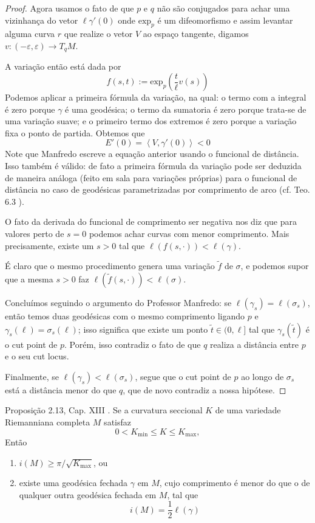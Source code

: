 \documentclass{book}
\begin{document}
\begin{proof}
Agora usamos o fato de que $p$ e $q$ não são
conjugados para
achar uma vizinhança do vetor $\ell
\gamma'(0)$ onde $\text{exp}_p$ é um
difeomorfismo e assim levantar alguma
curva $r$ que realize o vetor $V$ ao espaço
tangente,
 digamos $v:(-\varepsilon,\varepsilon) \to
 T_q M$.

A variação então está dada por
$$
f(s,t):=\text{exp}_p\left(\frac{t}{\ell}v(s)
\right)
$$
Podemos aplicar a primeira fórmula da
variação, na qual: o termo com a
integral é zero porque $\gamma$ é uma
geodésica; o termo da sumatoria é zero
porque trata-se de uma variação suave; e o
primeiro termo dos extremos é zero
porque a variação fixa o ponto de partida.
Obtemos que
$$
E'(0)=\left\langle{}V,\gamma'(0)\right\rangle{}<0
$$
Note que Manfredo escreve a equação anterior
usando o funcional de distância.
Isso também é válido: de fato a primeira
fórmula da variação pode ser
deduzida de maneira análoga (feito em sala
para variações próprias)
 para o funcional de distância no caso de
 geodésicas parametrizadas por
comprimento de arco (cf. Teo. 6.3
\cite{ler}).

O fato da derivada do funcional de
comprimento ser negativa nos diz que para
valores perto de $s=0$ podemos achar curvas
com menor comprimento. Mais
precisamente, existe um $s>0$ tal que
$\ell(f(s,\cdot))<\ell(\gamma)$.

É claro que o mesmo procedimento genera uma
variação $\tilde{f}$ de $\sigma$, e
podemos supor que a mesma $s>0$ faz
$\ell(\tilde{f}(s,\cdot))<\ell(\sigma)$.

Concluímos seguindo o argumento do Professor
Manfredo: se
$\ell(\gamma_s)=\ell(\sigma_s)$, então temos
duas geodésicas com o mesmo
comprimento ligando $p$ e
$\gamma_s(\ell)=\sigma_s(\ell)$; isso
significa
que existe um ponto $\tilde{t} \in (0,\ell]$
tal que $\gamma_s(\tilde{t})$ é
 o cut point de $p$. Porém, isso contradiz o
 fato de que $q$ realiza a
distância entre $p$ e o seu cut locus.

Finalmente, se
$\ell(\gamma_s)<\ell(\sigma_s)$, segue que o
cut point de $p$
 ao longo de $\sigma_s$ está a distância
 menor do que $q$, que de novo contradiz
a nossa hipótese.
\end{proof}

\begin{exercise}
\label{exercise-l8-2}
Proposição 2.13, Cap. XIII \cite{doc}. Se a
curvatura seccional $K$ de uma
variedade Riemanniana completa $M$ satisfaz
$$
0< K_{\text{min}}\leq K\leq K_{\text{max}},
$$
Então
\begin{enumerate}
\item $i(M) \geq \pi/\sqrt{K_{\text{max}}}$,
ou
\item existe uma geodésica fechada $\gamma$
em $M$, cujo comprimento é menor do
que o de qualquer outra geodésica fechada em
$M$, tal que
$$
i(M)=\frac{1}{2}\ell(\gamma)
$$
\end{enumerate}
\end{exercise}
\end{document}
